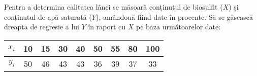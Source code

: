 \documentclass[]{article}
\begin{document}
Pentru a determina calitatea lânei se măsoară conținutul de biosulfit
(\(X\)) și conținutul de apă saturată (\(Y\)), amândouă fiind date în
procente. Să se găsească dreapta de regresie a lui \(Y\) în raport cu
\(X\) pe baza următoarelor date:

\begin{center}
\begin{table}[ht]
\centering
  \begin{tabular}{c|cccccccc}
    $x_i$ & 10 & 15 & 30 & 40 & 50 & 55 & 80 & 100\\
    \hline
    $y_i$ & 50 & 46 & 43 & 43 & 36 & 39 & 37 & 33
  \end{tabular}
\end{table}
\end{center}
\end{document}
